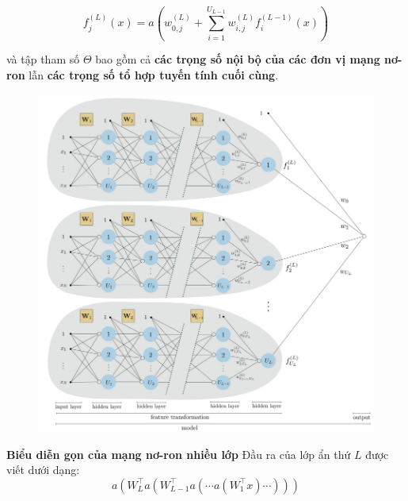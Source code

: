 \documentclass{book}
\begin{document}
    \[
    f^{(L)}_j(x) = a\left(w^{(L)}_{0,j} + \sum_{i=1}^{U_{L-1}} w^{(L)}_{i,j} f^{(L-1)}_i(x) \right)
    \]
    
    và tập tham số \( \Theta \) bao gồm cả \textbf{các trọng số nội bộ của các đơn vị mạng nơ-ron} lẫn \textbf{các trọng số tổ hợp tuyến tính cuối cùng}.
    
    \begin{figure}[H]
        \centering
        \includegraphics[width=1.0\linewidth]{images/general-model.png}
        \label{fig:general-model}
    \end{figure}
    
    \textbf{Biểu diễn gọn của mạng nơ-ron nhiều lớp}
    Đầu ra của lớp ẩn thứ \( L \) được viết dưới dạng:
    \[
    a\left(W_L^\top a\left(W_{L-1}^\top a\left(\cdots a\left(W_1^\top x\right)\cdots \right)\right)\right)
    \]
\end{document}
